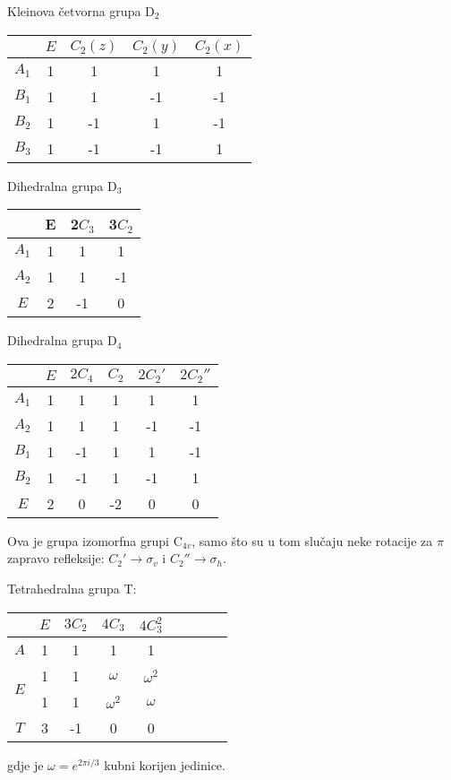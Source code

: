 Kleinova četvorna grupa D$_2$
\begin{center}
\begin{tabular}{c|cccc}
     & $E$ & $C_{2}(z)$ & $C_{2}(y)$ & $C_{2}(x)$ \\ \hline
    $A_1$ & 1 & 1 & 1 & 1 \\
    $B_1$ & 1 & 1 & -1 & -1 \\
    $B_2$ & 1 & -1 & 1 & -1 \\
    $B_3$ & 1 & -1 & -1 & 1 \\
\end{tabular}
\end{center}

Dihedralna grupa D$_3$
\begin{center}
\begin{tabular}{c|ccc}
  & E & 2$C_3$  & 3$C_2$ \\ \hline
$A_1$ & 1 & 1& 1 \\
$A_2$ & 1 & 1&-1 \\
 $E$  & 2 &-1& 0
\end{tabular}
\end{center}


Dihedralna grupa D$_{4}$
\begin{center}
    \begin{tabular}{c|ccccc}
         & $E$ & $2C_4$ & $C_2$ & $2C_{2}'$ & $2C_{2}''$ \\ \hline
        $A_1$ & 1 & 1 & 1 & 1 & 1 \\
        $A_2$ & 1 & 1 & 1 & -1 & -1 \\
        $B_1$ & 1 & -1 & 1 & 1 & -1 \\
        $B_2$ & 1 & -1 & 1 & -1 & 1 \\
        $E$ & 2 & 0 & -2 & 0 & 0 \\
    \end{tabular}
\end{center}
Ova je grupa izomorfna grupi C$_{4v}$, samo što su u tom  slučaju
neke rotacije za $\pi$ zapravo refleksije: $C_{2}' \to \sigma_v$ i
$C_{2}'' \to \sigma_h$.


Tetrahedralna grupa T:

\begin{center}
\begin{tabular}{c|cccccccc}
 & $E$ & $3C_2$ & $4C_3$ & $4C_{3}^2$  \\ \hline
$A$ & 1 & 1 & 1 & 1  \\
\multirow{2}{*}{$E$} & 1 & 1 & $\omega$ & $\omega^2$ \\
 & 1 & 1 & $\omega^2$ & $\omega$  \\
$T$ & 3 & -1 & 0 & 0  \\
\end{tabular}
\end{center}
gdje je $\omega = e^{2\pi i/3}$ kubni korijen jedinice.



